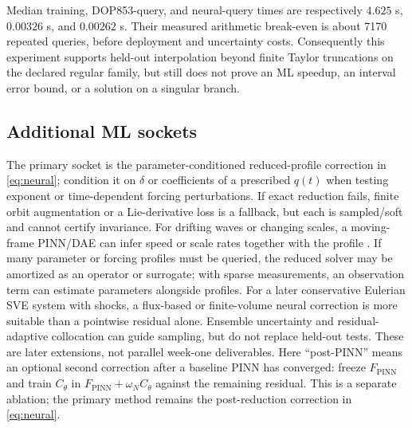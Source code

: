 \documentclass[11pt]{article}
\begin{document}
Median training, DOP853-query, and neural-query times are respectively
$4.625$ s, $0.00326$ s, and $0.00262$ s. Their measured arithmetic break-even
is about 7170 repeated queries, before deployment and uncertainty costs.
Consequently this experiment supports held-out interpolation beyond finite
Taylor truncations on the declared regular family, but still does not prove an
ML speedup, an interval error bound, or a solution on a singular branch.

\subsection{Additional ML sockets}
The primary socket is the parameter-conditioned reduced-profile correction
in \eqref{eq:neural}; condition it on $\delta$ or coefficients of a prescribed
$q(t)$ when testing exponent or time-dependent forcing perturbations. If exact
reduction fails, finite orbit augmentation or a Lie-derivative loss is a
fallback, but each is sampled/soft and cannot certify invariance. For drifting
waves or changing scales, a moving-frame PINN/DAE can infer speed or scale
rates together with the profile \cite{flow}. If many parameter or forcing
profiles must be queried, the reduced solver may be amortized as an operator
or surrogate; with sparse measurements, an observation term can estimate
parameters alongside profiles.
For a later conservative Eulerian SVE system with shocks, a flux-based or
finite-volume neural correction is more suitable than a pointwise residual
alone. Ensemble uncertainty and residual-adaptive collocation can guide
sampling, but do not replace held-out tests. These are later extensions, not
parallel week-one deliverables. Here ``post-PINN'' means an optional second
correction after a baseline PINN has converged: freeze
$F_{\mathrm{PINN}}$ and train $C_\theta$ in
$F_{\mathrm{PINN}}+\omega_N C_\theta$ against the remaining residual. This is a
separate ablation; the primary method remains the post-reduction correction
in \eqref{eq:neural}.
\end{document}

